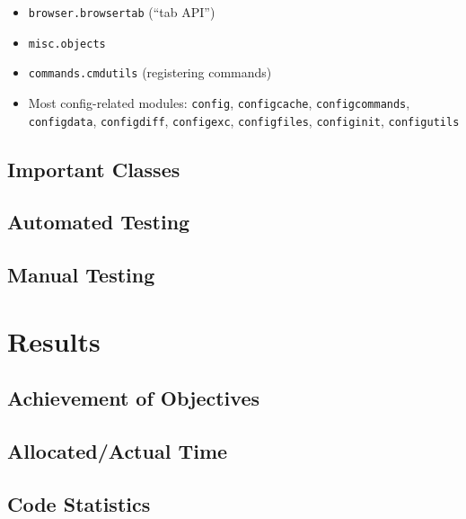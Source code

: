 \documentclass[a4paper,parskip=full]{scrreprt}
\begin{document}
\begin{itemize}
  \item \verb|browser.browsertab| (``tab API'')
  \item \verb|misc.objects|
  \item \verb|commands.cmdutils| (registering commands)
  \item Most config-related modules: \verb|config|, \verb|configcache|,
    \verb|configcommands|, \verb|configdata|, \verb|configdiff|,
    \verb|configexc|, \verb|configfiles|, \verb|configinit|, \verb|configutils|
\end{itemize}


\section{Important Classes}

\section{Automated Testing}

\section{Manual Testing}


\chapter{Results}
\label{ch:results}

\section{Achievement of Objectives}


\section{Allocated/Actual Time}
\section{Code Statistics}
\end{document}
